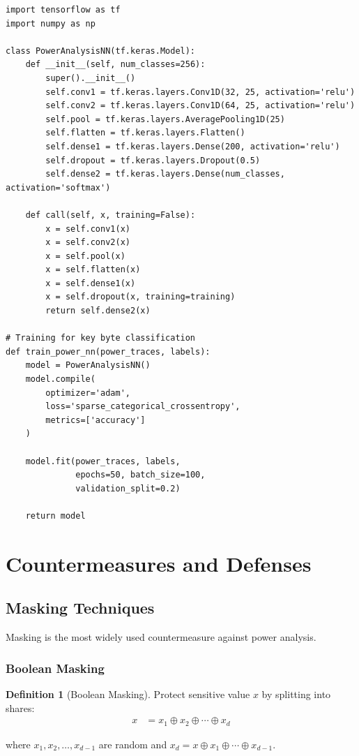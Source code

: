 \documentclass[11pt,a4paper]{article}
\theoremstyle{definition}
\newtheorem{definition}{Definition}[section]
\begin{document}
\begin{lstlisting}[caption={Neural Network Power Analysis}]
import tensorflow as tf
import numpy as np

class PowerAnalysisNN(tf.keras.Model):
    def __init__(self, num_classes=256):
        super().__init__()
        self.conv1 = tf.keras.layers.Conv1D(32, 25, activation='relu')
        self.conv2 = tf.keras.layers.Conv1D(64, 25, activation='relu')  
        self.pool = tf.keras.layers.AveragePooling1D(25)
        self.flatten = tf.keras.layers.Flatten()
        self.dense1 = tf.keras.layers.Dense(200, activation='relu')
        self.dropout = tf.keras.layers.Dropout(0.5)
        self.dense2 = tf.keras.layers.Dense(num_classes, activation='softmax')
    
    def call(self, x, training=False):
        x = self.conv1(x)
        x = self.conv2(x)
        x = self.pool(x)
        x = self.flatten(x)
        x = self.dense1(x)
        x = self.dropout(x, training=training)
        return self.dense2(x)

# Training for key byte classification
def train_power_nn(power_traces, labels):
    model = PowerAnalysisNN()
    model.compile(
        optimizer='adam',
        loss='sparse_categorical_crossentropy', 
        metrics=['accuracy']
    )
    
    model.fit(power_traces, labels,
              epochs=50, batch_size=100,
              validation_split=0.2)
    
    return model
\end{lstlisting}

\section{Countermeasures and Defenses}

\subsection{Masking Techniques}

Masking is the most widely used countermeasure against power analysis.

\subsubsection{Boolean Masking}

\begin{definition}[Boolean Masking]
Protect sensitive value $x$ by splitting into shares:
\begin{align}
x &= x_1 \oplus x_2 \oplus \cdots \oplus x_d
\end{align}

where $x_1, x_2, \ldots, x_{d-1}$ are random and $x_d = x \oplus x_1 \oplus \cdots \oplus x_{d-1}$.
\end{definition}
\end{document}
